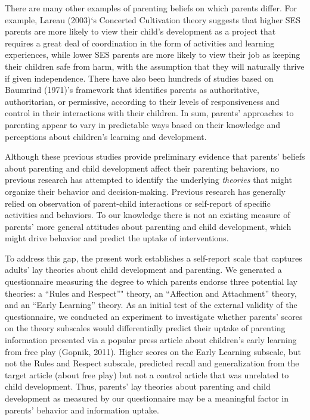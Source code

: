 \documentclass[10pt, letterpaper]{article}
\begin{document}
There are many other examples of parenting beliefs on which parents
differ. For example, Lareau (2003)`s Concerted Cultivation theory
suggests that higher SES parents are more likely to view their child's
development as a project that requires a great deal of coordination in
the form of activities and learning experiences, while lower SES parents
are more likely to view their job as keeping their children safe from
harm, with the assumption that they will naturally thrive if given
independence. There have also been hundreds of studies based on Baumrind
(1971)'s framework that identifies parents as authoritative,
authoritarian, or permissive, according to their levels of
responsiveness and control in their interactions with their children. In
sum, parents' approaches to parenting appear to vary in predictable ways
based on their knowledge and perceptions about children's learning and
development.

Although these previous studies provide preliminary evidence that
parents' beliefs about parenting and child development affect their
parenting behaviors, no previous research has attempted to identify the
underlying \emph{theories} that might organize their behavior and
decision-making. Previous research has generally relied on observation
of parent-child interactions or self-report of specific activities and
behaviors. To our knowledge there is not an existing measure of parents'
more general attitudes about parenting and child development, which
might drive behavior and predict the uptake of interventions.

To address this gap, the present work establishes a self-report scale
that captures adults' lay theories about child development and
parenting. We generated a questionnaire measuring the degree to which
parents endorse three potential lay theories: a ``Rules and Respect''"
theory, an ``Affection and Attachment'' theory, and an ``Early
Learning'' theory. As an initial test of the external validity of the
questionnaire, we conducted an experiment to investigate whether
parents' scores on the theory subscales would differentially predict
their uptake of parenting information presented via a popular press
article about children's early learning from free play (Gopnik, 2011).
Higher scores on the Early Learning subscale, but not the Rules and
Respect subscale, predicted recall and generalization from the target
article (about free play) but not a control article that was unrelated
to child development. Thus, parents' lay theories about parenting and
child development as measured by our questionnaire may be a meaningful
factor in parents' behavior and information uptake.
\end{document}
